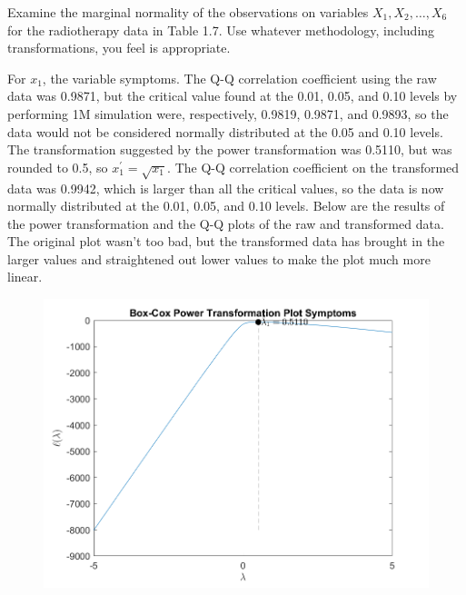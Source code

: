 Examine the marginal normality of the observations on variables $X_{1} , X_{2}, \dots, X_{6}$ for the
radiotherapy data in Table 1.7. Use whatever methodology, including transformations, you feel is appropriate.

For $x_{1}$, the variable symptoms. The Q-Q correlation coefficient using the raw data was 0.9871, but the critical value found at the 0.01, 0.05, and 0.10 levels by performing 1M simulation were, respectively, 0.9819, 0.9871, and 0.9893, so the data would not be considered normally distributed at the 0.05 and 0.10 levels. The transformation suggested by the power transformation was 0.5110, but was rounded to 0.5, so $x_{1}^{\prime} = \sqrt{x_{1}}$. The Q-Q correlation coefficient on the transformed data was 0.9942, which is larger than all the critical values, so the data is now normally distributed at the 0.01, 0.05, and 0.10 levels. Below are the results of the power transformation and the Q-Q plots of the raw and transformed data. The original plot wasn't too bad, but the transformed data has brought in the larger values and straightened out lower values to make the plot much more linear.
\begin{center}
    \begin{figure}[H]
        \centering
        \includegraphics[scale=0.6]{./matlab/chapter-4/sol4.32.power.1.png}
    \end{figure}
\end{center}


